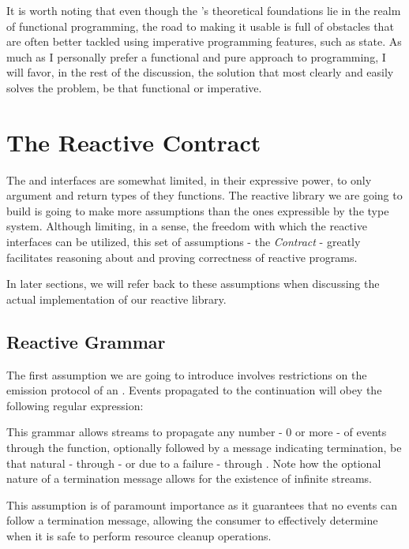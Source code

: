 It is worth noting that even though the 's theoretical foundations lie in the realm of functional programming, the road to making it usable is full of obstacles that are often better tackled using imperative programming features, such as state. As much as I personally prefer a functional and pure approach to programming, I will favor, in the rest of the discussion, the solution that most clearly and easily solves the problem, be that functional or imperative.

\section{The Reactive Contract}
\label{sec:contract}

The  and  interfaces are somewhat limited, in their expressive power, to only argument and return types of they functions. The reactive library we are going to build is going to make more assumptions than the ones expressible by the type system. Although limiting, in a sense, the freedom with which the reactive interfaces can be utilized, this set of assumptions - the \textit{Contract} - greatly facilitates reasoning about and proving correctness of reactive programs\cite{MS2010-RxDesign}.

In later sections, we will refer back to these assumptions when discussing the actual implementation of our reactive library.

\subsection{Reactive Grammar}
\label{ass-grammar}
The first assumption we are going to introduce involves restrictions on the emission protocol of an . Events propagated to the  continuation will obey the following regular expression:

\begin{center}\end{center}

This grammar allows streams to propagate any number - 0 or more - of events through the  function, optionally followed by a message indicating termination, be that natural - through  - or due to a failure - through . Note how the optional nature of a termination message allows for the existence of infinite streams. 

This assumption is of paramount importance as it guarantees that no events can follow a termination message, allowing the consumer to effectively determine when it is safe to perform resource cleanup operations. 

